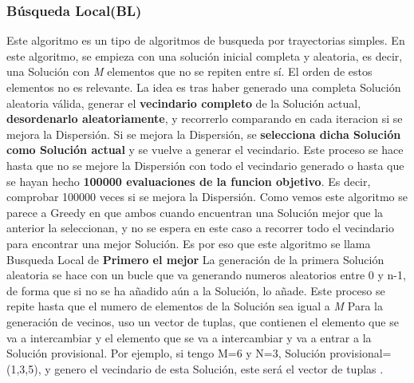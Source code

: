 \documentclass{article}
\begin{document}
\subsubsection{\small Búsqueda Local(BL)}
 Este algoritmo es un tipo de algoritmos de busqueda por trayectorias simples.
\newline En este algoritmo, se empieza con una solución inicial completa y aleatoria,
es decir, una Solución con \emph{M} elementos que no se repiten entre sí.
El orden de estos elementos no es relevante.
\vspace{5mm}
\newline La idea es tras haber generado una completa Solución aleatoria válida, generar el 
\textbf{vecindario completo} de la Solución actual, \textbf{desordenarlo aleatoriamente}, y recorrerlo 
comparando en cada iteracion si se mejora la Dispersión.
\newline Si se mejora la Dispersión, se \textbf{selecciona dicha Solución como Solución actual} y 
se vuelve a generar el vecindario. Este proceso se hace hasta que no se mejore la Dispersión con 
todo el vecindario generado o hasta que se hayan hecho \textbf{100000 evaluaciones de la funcion objetivo}.
Es decir, comprobar 100000 veces si se mejora la Dispersión.
\newline Como vemos este algoritmo se parece a Greedy en que ambos cuando encuentran una Solución 
mejor que la anterior la seleccionan, y no se espera en este caso a recorrer todo el vecindario para 
encontrar una mejor Solución. Es por eso que este algoritmo se llama Busqueda Local de \textbf{Primero el mejor}
\vspace{5mm}
\newline La generación de la primera Solución aleatoria se hace con un bucle que va generando 
numeros aleatorios entre 0 y n-1, de forma que si no se ha añadido aún a la Solución, lo añade.
Este proceso se repite hasta que el numero de elementos de la Solución sea igual a \emph{M}
\newline Para la generación de vecinos, uso un vector de tuplas, que contienen el elemento que se 
va a intercambiar y el elemento que se va a intercambiar y va a entrar a la Solución provisional.
\newline Por ejemplo, si tengo {M}=6 y {N}=3, Solución provisional=(1,3,5), y genero el vecindario de esta Solución, 
este será el vector de tuplas .
\end{document}
